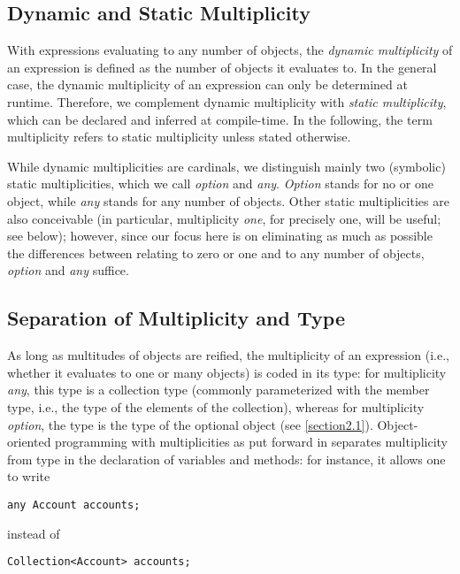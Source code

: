 {\subsection{Dynamic and Static Multiplicity}
\label{section3.1}

\noindent With expressions evaluating to any number of objects, the
\emph{dynamic multiplicity} of an expression is defined as the number
of objects it evaluates to. In the general case, the dynamic multiplicity of
an expression can only be determined at runtime. Therefore, we complement
dynamic multiplicity with \emph{static multiplicity}, which can be
declared and inferred at compile-time. In the following, the term
multiplicity refers to static multiplicity unless stated otherwise.

While dynamic multiplicities are cardinals, we distinguish mainly two
(symbolic) static multiplicities, which we call \emph{option} and
\emph{any}. \emph{Option} stands for no or one ob\-ject, while
\emph{any} stands for any number of objects. Other static
multiplicities are also conceivable (in particular, multiplicity \emph{one}, for
precisely one, will be useful; see below); however, since our focus here is
on eliminating as much as possible the differences between relating to zero or one and to any number of objects, \emph{option} and \emph{any} suffice.

\subsection{Separation of Multiplicity and Type}
\label{section3.2}

\noindent As long as multitudes of objects are reified, the multiplicity of
an expression (i.e., whether it evaluates to one or many objects) is coded
in its type: for multiplicity \emph{any}, this type is a collection
type (commonly parameterized with the member type, i.e., the type of the
elements of the collection), whereas for multiplicity \emph{option},
the type is the type of the optional object (see \autoref{section2.1}). Object-oriented
programming with multiplicities as put forward in \cite{ref37} separates
multiplicity from type in the declaration of variables and methods: for
instance, it allows one to write

\begin{lstlisting}
any Account accounts;
\end{lstlisting}

\noindent instead of

\begin{lstlisting}
Collection<Account> accounts;
\end{lstlisting}

}
